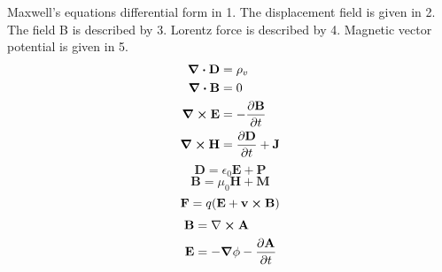 \documentclass{article}
\renewcommand{\vec}[1]{\mathbf{#1}}
\begin{document}
Maxwell's equations differential form in 1. The displacement field is given in 2.
The field B is described by 3. Lorentz force is described by 4. Magnetic vector potential
is given in 5.
\begin{equation}
\begin{split}
    \div \vec{D} &= \rho_v \\
    \div \vec{B} &= 0 \\
    \curl \vec{E} &= -\frac{\partial \vec{B}}{\partial t} \\
    \curl \vec{H} &= \frac{\partial \vec{D}}{\partial t} + \vec{J}
\end{split}
\end{equation}
\begin{equation}
    \vec{D} = \epsilon_0 \vec{E} + \vec{P}
\end{equation}
\begin{equation}
    \vec{B} = \mu_0 \vec{H} + \vec{M}
\end{equation}
\begin{equation}
    \vec{F} = q (\vec{E} + \vec{v} \cross \vec{B})
\end{equation}
\begin{equation}
\begin{split}
    \vec{B} &= \nabla \cross \vec{A} \\
    \vec{E} &= -\grad \phi - \frac{\partial \vec{A}}{\partial t}
\end{split}
\end{equation}
\end{document}
